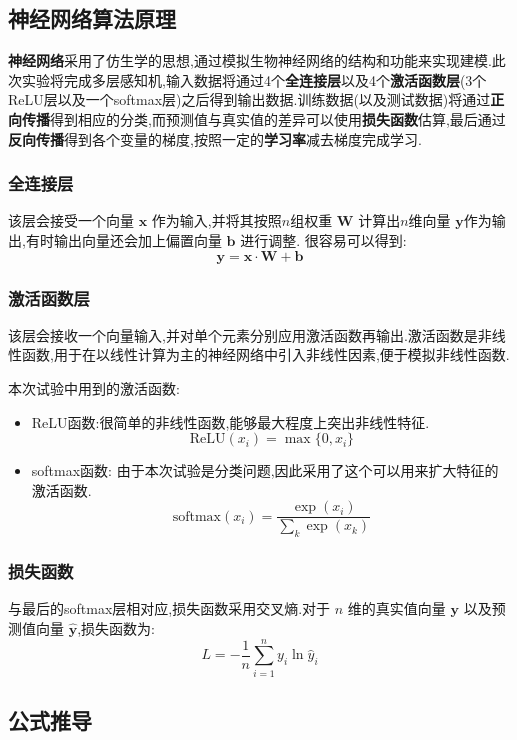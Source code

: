 \subsection{神经网络算法原理}
\textbf{神经网络}采用了仿生学的思想,通过模拟生物神经网络的结构和功能来实现建模.此次实验将完成多层感知机,输入数据将通过4个\textbf{全连接层}以及4个\textbf{激活函数层}(3个ReLU层以及一个softmax层)之后得到输出数据.训练数据(以及测试数据)将通过\textbf{正向传播}得到相应的分类,而预测值与真实值的差异可以使用\textbf{损失函数}估算,最后通过\textbf{反向传播}得到各个变量的梯度,按照一定的\textbf{学习率}减去梯度完成学习.

\subsubsection{全连接层}
该层会接受一个向量 $\boldsymbol{x}$ 作为输入,并将其按照$n$组权重 $\boldsymbol{W}$ 计算出$n$维向量 $\boldsymbol{y}$作为输出,有时输出向量还会加上偏置向量 $\boldsymbol{b}$ 进行调整.
很容易可以得到:
$$\boldsymbol{y} = \boldsymbol{x} \cdot \boldsymbol{W} + \boldsymbol{b}$$

\subsubsection{激活函数层}
该层会接收一个向量输入,并对单个元素分别应用激活函数再输出.激活函数是非线性函数,用于在以线性计算为主的神经网络中引入非线性因素,便于模拟非线性函数.

本次试验中用到的激活函数:
\begin{itemize}
    \item ReLU函数:很简单的非线性函数,能够最大程度上突出非线性特征.
    $$ \mathrm{ReLU}(x_i) = \max\{0, x_i\}$$
    \item softmax函数: 由于本次试验是分类问题,因此采用了这个可以用来扩大特征的激活函数.
    $$ \mathrm{softmax}(x_i) = \frac{\exp(x_i)}{\sum_k \exp(x_k)}$$
\end{itemize}

\subsubsection{损失函数}
与最后的softmax层相对应,损失函数采用交叉熵.对于 $n$ 维的真实值向量 $\boldsymbol{y}$ 以及预测值向量 $\boldsymbol{\hat{y}}$,损失函数为:
$$L = -\frac{1}{n} \sum_{i=1}^n y_i \ln \hat{y}_i$$

\subsection{公式推导}

